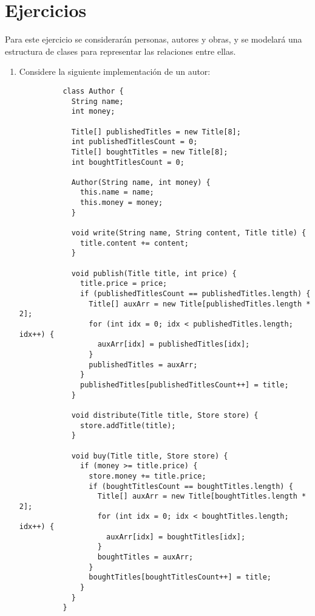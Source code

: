 \section{Ejercicios}
  \begin{Exercise}[title={Publicaciones}]
    Para este ejercicio se considerarán personas, autores y obras, y se modelará una 
    estructura de clases para representar las relaciones entre ellas.

    \begin{enumerate}
      
      \item Considere la siguiente implementación de un autor:
        \begin{verbatim}
          class Author {
            String name;
            int money;

            Title[] publishedTitles = new Title[8];
            int publishedTitlesCount = 0;
            Title[] boughtTitles = new Title[8];
            int boughtTitlesCount = 0;

            Author(String name, int money) {
              this.name = name;
              this.money = money;
            }

            void write(String name, String content, Title title) {
              title.content += content;
            }

            void publish(Title title, int price) {
              title.price = price;
              if (publishedTitlesCount == publishedTitles.length) {
                Title[] auxArr = new Title[publishedTitles.length * 2];
                for (int idx = 0; idx < publishedTitles.length; idx++) {
                  auxArr[idx] = publishedTitles[idx];
                }
                publishedTitles = auxArr;
              }
              publishedTitles[publishedTitlesCount++] = title;
            }

            void distribute(Title title, Store store) {
              store.addTitle(title);
            }

            void buy(Title title, Store store) {
              if (money >= title.price) {
                store.money += title.price;
                if (boughtTitlesCount == boughtTitles.length) {
                  Title[] auxArr = new Title[boughtTitles.length * 2];
                  for (int idx = 0; idx < boughtTitles.length; idx++) {
                    auxArr[idx] = boughtTitles[idx];
                  }
                  boughtTitles = auxArr;
                }
                boughtTitles[boughtTitlesCount++] = title;
              }
            }
          }
        \end{verbatim}


\end{enumerate}
\end{Exercise}
